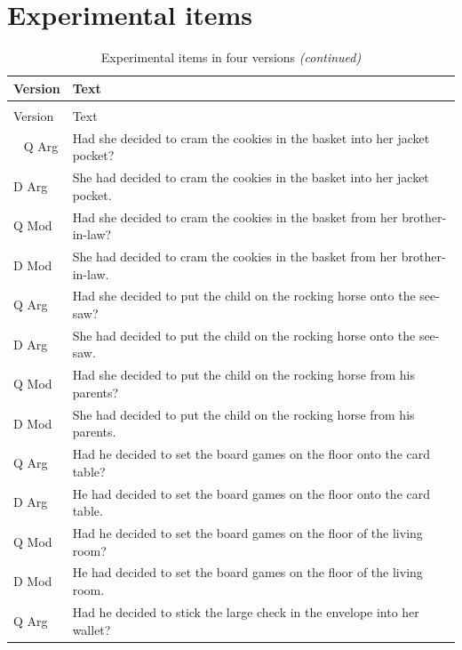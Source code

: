 \documentclass[12pt,oneside]{book}
\begin{document}
\singlespacing

\newpage

\hypertarget{appendix-appendices}{%
\appendix}


\hypertarget{appExp}{%
\chapter{Experimental items}\label{appExp}}

\begin{longtable}{ll}
\caption{\label{tab:unnamed-chunk-1}Experimental items in four versions}\\
\toprule
Version & Text\\
\midrule
\endfirsthead
\caption[]{\label{tab:unnamed-chunk-1}Experimental items in four versions \textit{(continued)}}\\
\toprule
Version & Text\\
\midrule
\endhead
\
\endfoot
\bottomrule
\endlastfoot
Q Arg & Had she decided to cram the cookies in the basket into her jacket pocket?\\
D Arg & She had decided to cram the cookies in the basket into her jacket pocket.\\
Q Mod & Had she decided to cram the cookies in the basket from her brother-in-law?\\
D Mod & She had decided to cram the cookies in the basket from her brother-in-law.\\
\addlinespace
Q Arg & Had she decided to put the child on the rocking horse onto the see-saw?\\
D Arg & She had decided to put the child on the rocking horse onto the see-saw.\\
Q Mod & Had she decided to put the child on the rocking horse from his parents?\\
D Mod & She had decided to put the child on the rocking horse from his parents.\\
\addlinespace
Q Arg & Had he decided to set the board games on the floor onto the card table?\\
D Arg & He had decided to set the board games on the floor onto the card table.\\
Q Mod & Had he decided to set the board games on the floor of the living room?\\
D Mod & He had decided to set the board games on the floor of the living room.\\
\addlinespace
Q Arg & Had he decided to stick the large check in the envelope into her wallet?\\

\end{longtable}
\end{document}
